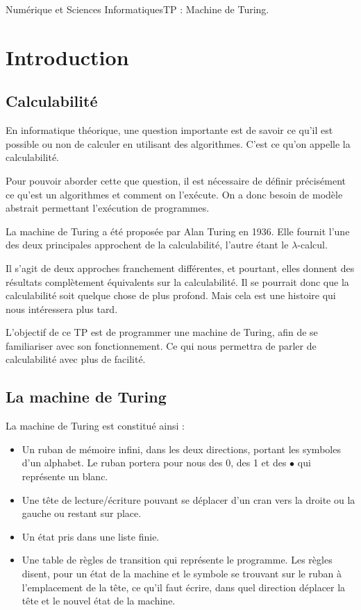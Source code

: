 \documentclass[11pt,a4paper,french,twoside]{PMCours}
\begin{document}
{Numérique et Sciences Informatiques}{TP : Machine de Turing.}




\section{Introduction}

\subsection{Calculabilité}
En informatique théorique, une question importante est de savoir ce qu'il est 
possible ou non de calculer en utilisant des algorithmes. C'est ce qu'on appelle
la calculabilité.

\medskip
Pour pouvoir aborder cette que question, il est nécessaire de définir précisément
ce qu'est un algorithmes et comment on l'exécute. On a donc besoin de modèle
abstrait permettant l'exécution de programmes.

\medskip
La machine de Turing a été proposée par Alan Turing en 1936. Elle fournit l'une
des deux principales approchent de la calculabilité, l'autre étant le 
$\lambda$-calcul.

\medskip
Il s'agit de deux approches franchement différentes, et pourtant, elles
donnent des résultats complètement équivalents sur la calculabilité. 
Il se pourrait donc que la calculabilité soit quelque chose de plus profond.
Mais cela est une histoire qui nous intéressera plus tard.

\medskip
L'objectif de ce TP est de programmer une machine de Turing, afin de se 
familiariser avec son fonctionnement. Ce qui nous permettra de parler de 
calculabilité avec plus de facilité.


\subsection{La machine de Turing}
La machine de Turing est constitué ainsi :
\begin{itemize}
  \item Un ruban de mémoire infini, dans les deux directions, portant les 
  symboles d'un alphabet. Le ruban portera pour nous des 0, des 1 et des $\bullet$
  qui représente un blanc.
  \item Une tête de lecture/écriture pouvant se déplacer d'un cran vers la droite
  ou la gauche ou restant sur place.
  \item Un état pris dans une liste finie.
  \item Une table de règles de transition qui représente le programme. Les règles
  disent, pour un état de la machine et le symbole se trouvant sur le ruban à 
  l'emplacement de la tête, ce qu'il faut écrire, dans quel direction déplacer 
  la tête et le nouvel état de la machine.
\end{itemize}
\end{document}

